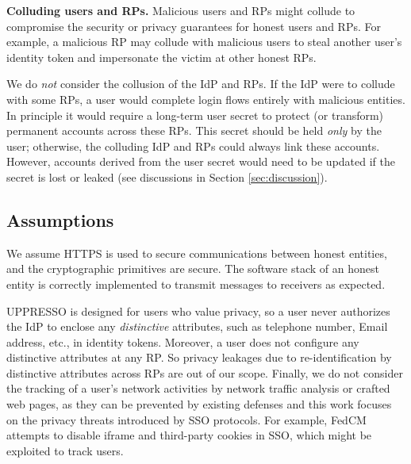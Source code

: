 \noindent \textbf{Colluding users and RPs.}
Malicious users and RPs might collude to compromise the security or privacy guarantees for honest users and RPs.
For example, a malicious RP may collude with malicious users to steal another user's identity token and impersonate the victim at other honest RPs.

We do \emph{not} consider the collusion of the IdP and RPs.
If the IdP were to collude with some RPs, a user would complete login flows entirely with malicious entities.
In principle it would require a long-term user secret to protect (or transform) permanent accounts across these RPs.
This secret should be held \emph{only} by the user; otherwise, the colluding IdP and RPs could always link these accounts.
However, accounts derived from the user secret would need to be updated if the secret is lost or leaked (see discussions in Section \ref{sec:discussion}).

\subsection{Assumptions}
We assume HTTPS is used to secure communications between honest entities, and the cryptographic primitives are secure. The software stack of an honest entity is correctly implemented to transmit messages to receivers as expected.

UPPRESSO is designed for users who value privacy,
so a user never authorizes the IdP to enclose any \emph{distinctive} attributes, such as telephone number, Email address, etc., in identity tokens. Moreover, a user does not configure any distinctive attributes at any RP.
So privacy leakages due to re-identification by distinctive attributes across RPs are out of our scope.
Finally, we do not consider the tracking of a user's network activities
         by network traffic analysis or crafted web pages,
as they can be prevented by existing defenses and this work focuses on the privacy threats introduced by SSO protocols.
For example,
 FedCM \cite{FedCM} attempts to disable iframe and third-party cookies in SSO, which might be exploited to track users.


